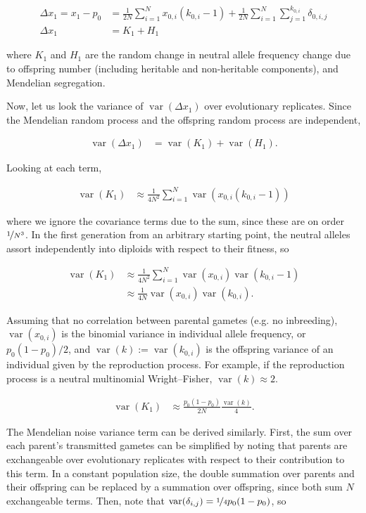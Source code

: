 \documentclass[11pt]{article}
\DeclareMathOperator{\var}{var}
\begin{document}
\begin{align}
  \Delta x_1 = x_1 - p_0 &= \frac{1}{2N} \sum_{i=1}^N x_{0,i} (k_{0,i} - 1) + \frac{1}{2N} \sum_{i=1}^N \sum_{j=1}^{k_{0,i}} \delta_{0,i,j} \\
  \Delta x_1 &= K_1 + H_1
\end{align}

where $K_1$ and $H_1$ are the random change in neutral allele frequency change
due to offspring number (including heritable and non-heritable components), and
Mendelian segregation.

Now, let us look the variance of $\var(\Delta x_1)$ over evolutionary
replicates. Since the Mendelian random process and the offspring random process
are independent,

\begin{align}
  \var(\Delta x_1) &= \var(K_1) + \var(H_1).
\end{align}

Looking at each term,

\begin{align}
  \var(K_1) &\approx \frac{1}{4N^2} \sum_{i=1}^N \var\left(x_{0,i} (k_{0,i} - 1) \right)
\end{align}

where we ignore the covariance terms due to the sum, since these are on order
$\nicefrac{1}{N^3}$. In the first generation from an arbitrary starting point,
the neutral alleles assort independently into diploids with respect to their
fitness, so

\begin{align}
  \var(K_1) &\approx \frac{1}{4N^2} \sum_{i=1}^N \var(x_{0,i}) \var(k_{0,i} - 1)  \\
            &\approx \frac{1}{4N} \var(x_{0,i}) \var(k_{0,i}).
\end{align}

Assuming that no correlation between parental gametes (e.g. no inbreeding),
$\var(x_{0,i})$ is the binomial variance in individual allele frequency, or
$p_0(1-p_0)/2$, and $\var(k) := \var(k_{0,i})$ is the offspring variance of an
individual given by the reproduction process. For example, if the reproduction
process is a neutral multinomial Wright--Fisher, $\var(k) \approx 2$.

\begin{align}
  \var(K_1) &\approx \frac{p_0(1-p_0)}{2N} \frac{\var(k)}{4}.
\end{align}

The Mendelian noise variance term can be derived similarly. First, the sum over
each parent's transmitted gametes can be simplified by noting that parents are
exchangeable over evolutionary replicates with respect to their contribution to
this term. In a constant population size, the double summation over parents and
their offspring can be replaced by a summation over offspring, since both sum
$N$ exchangeable terms. Then, note that $\var(\delta_{i,j}) = \nicefrac{1}{4}
p_0(1-p_0)$, so
\end{document}
